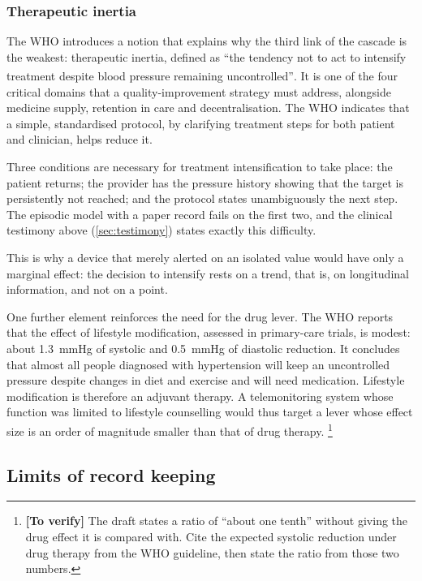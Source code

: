 \documentclass[12pt,a4paper,oneside]{report}
\newcommand{\verify}[1]{\footnote{\textbf{[To verify]} #1}}
\newcommand{\bq}[1]{``#1''\textsuperscript{\dag}}
\begin{document}
\subsubsection{Therapeutic inertia}\label{sec:inertia}

The WHO introduces a notion that explains why the third link of the cascade is the weakest: therapeutic inertia, defined as \bq{the tendency not to act to intensify treatment despite blood pressure remaining uncontrolled}. It is one of the four critical domains that a quality-improvement strategy must address, alongside medicine supply, retention in care and decentralisation. The WHO indicates that a simple, standardised protocol, by clarifying treatment steps for both patient and clinician, helps reduce it.

Three conditions are necessary for treatment intensification to take place: the patient returns; the provider has the pressure history showing that the target is persistently not reached; and the protocol states unambiguously the next step. The episodic model with a paper record fails on the first two, and the clinical testimony above (\cref{sec:testimony}) states exactly this difficulty.

This is why a device that merely alerted on an isolated value would have only a marginal effect: the decision to intensify rests on a trend, that is, on longitudinal information, and not on a point.

One further element reinforces the need for the drug lever. The WHO reports that the effect of lifestyle modification, assessed in primary-care trials, is modest: about 1.3~mmHg of systolic and 0.5~mmHg of diastolic reduction. It concludes that almost all people diagnosed with hypertension will keep an uncontrolled pressure despite changes in diet and exercise and will need medication. Lifestyle modification is therefore an adjuvant therapy. A telemonitoring system whose function was limited to lifestyle counselling would thus target a lever whose effect size is an order of magnitude smaller than that of drug therapy.%
\verify{The draft states a ratio of ``about one tenth'' without giving the drug effect it is compared with. Cite the expected systolic reduction under drug therapy from the WHO guideline, then state the ratio from those two numbers.}

\subsection{Limits of record keeping}\label{sec:records}
\end{document}
